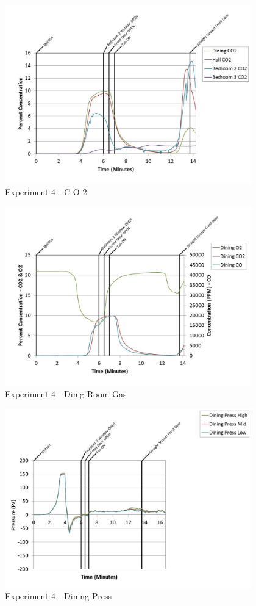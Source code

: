\documentclass{article}
\begin{document}
\begin{appendices}
	\clearpage

	\begin{figure}[h!]
		\centering
		\includegraphics[height=3.05in]{0_Images/Results_Charts/Exp_4_Charts/CO2.pdf}
		\caption{Experiment 4 - C O 2}
	\end{figure}
 

	\begin{figure}[h!]
		\centering
		\includegraphics[height=3.05in]{0_Images/Results_Charts/Exp_4_Charts/DinigRoomGas.pdf}
		\caption{Experiment 4 - Dinig Room Gas}
	\end{figure}
 
	\clearpage

	\begin{figure}[h!]
		\centering
		\includegraphics[height=3.05in]{0_Images/Results_Charts/Exp_4_Charts/DiningPress.pdf}
		\caption{Experiment 4 - Dining Press}
	\end{figure}
 


\end{appendices}
\end{document}
